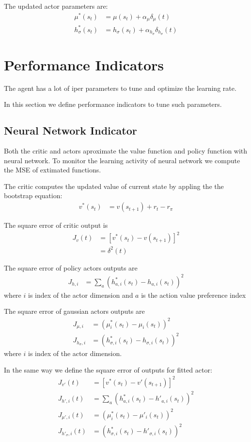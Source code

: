 \documentclass[]{article}
\begin{document}
The updated actor parameters are:
\begin{align}
	\mu^*(s_t)&			= \mu(s_t) + \alpha_\mu \delta_\mu(t)
	\\
	h^*_\sigma(s_t)&	= h_\sigma(s_t) + \alpha_{h_\sigma} \delta_{h_\sigma}(t)
\end{align}
\section{Performance Indicators}

The agent has a lot of iper parameters to tune and optimize the learning rate.

In this section we define performance indicators to tune such  parameters.

\subsection{Neural Network Indicator}

Both the critic and actors aproximate the value function and policy function with neural network.
To monitor the learning activity of neural network we compute the MSE of extimated functions.

The critic computes the updated value of current state by appling the the bootstrap equation:
\begin{align*}
	v^*(s_t)&	= v(s_{t+1}) + r_t - r_\pi 
\end{align*}

The square error of critic output is
\begin{align*}
	J_v(t)&	= [v^*(s_t) - v(s_{t+1})]^2
	\\
	&		= \delta^2(t)
\end{align*}

The square error of policy actors outputs are
\begin{align*}
	J_{h, i}&	= \sum_a (h_{a,i}^*(s_t) - h_{a,i}(s_t))^2
\end{align*}
where $ i $ is index of the actor dimension and $ a $ is the action value preference index

The square error of gaussian actors outputs are
\begin{align*}
	J_{\mu, i}&			= (\mu_i^*(s_t) - \mu_i(s_t))^2
	\\
	J_{h_\sigma, i}&	= (h_{\sigma, i}^*(s_t) - h_{\sigma, i}(s_t))^2
\end{align*}
where $ i $ is index of the actor dimension.

In the same way we define the square error of outputs for fitted actor:
\begin{align*}
	J_{v'}(t)&				= [v^*(s_t) - v'(s_{t+1})]^2
	\\
	J_{h',i}(t)&			= \sum_a (h_{a,i}^*(s_t) - h'_{a,i}(s_t))^2
	\\
	J_{\mu', i}(t)&			= (\mu_i^*(s_t) - \mu'_i(s_t))^2
	\\
	J_{h'_\sigma, i}(t)&	= (h_{\sigma, i}^*(s_t) - h'_{\sigma, i}(s_t))^2
\end{align*}
\end{document}
